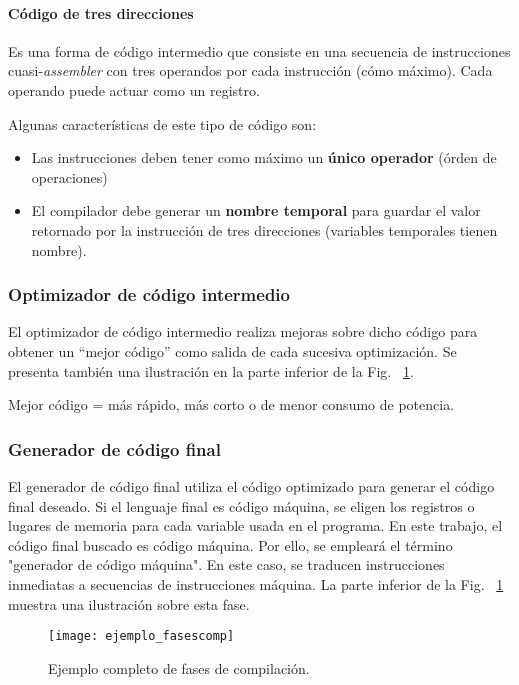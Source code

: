 \paragraph*{Código de tres direcciones}

    Es una forma de código intermedio que consiste en una secuencia de instrucciones
    cuasi-\emph{assembler} con tres operandos por cada instrucción (cómo máximo). Cada
    operando puede actuar como un registro.

    Algunas características de este tipo de código son:

    \begin{itemize}
        \item Las instrucciones deben tener como máximo un \textbf{único operador} (órden de
        operaciones)
        \item El compilador debe generar un \textbf{nombre temporal} para guardar el valor retornado
        por la instrucción de tres direcciones (variables temporales tienen nombre).
    \end{itemize}


\subsubsection{Optimizador de código intermedio}

    El optimizador de código intermedio realiza mejoras sobre  dicho código para obtener un “mejor código” como salida de
    cada sucesiva optimización. Se presenta también una ilustración en la parte inferior de la Fig. ~\ref{fig:fasesEjemplo}.

    \begin{center}
        Mejor código = más rápido, más corto o de menor consumo de potencia.
    \end{center}

\subsubsection{Generador de código final}

    El generador de código final utiliza el código optimizado para generar el código final deseado.
    Si el lenguaje final es código máquina, se eligen los registros o lugares de memoria para
    cada variable usada en el programa. 
    En este trabajo, el código final buscado es código máquina. Por ello, se empleará el término "generador de código máquina".
    En este caso, se traducen instrucciones inmediatas a secuencias de instrucciones máquina.
    La parte inferior de la Fig. ~\ref{fig:fasesEjemplo} muestra una ilustración sobre esta fase.

    \begin{figure}[p]
        \begingroup
            \centering
                \texttt{[image: ejemplo\_fasescomp]}
                \caption{Ejemplo completo de fases de compilación.\cite{aho_compilers:_2007}}
                \label{fig:fasesEjemplo}
            \par
        \endgroup
    \end{figure}
